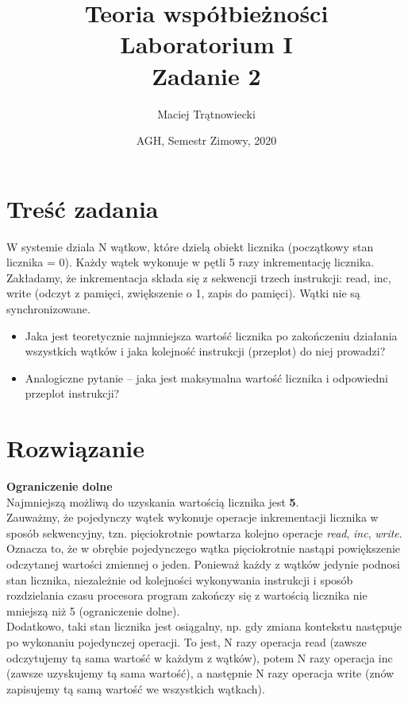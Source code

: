 \documentclass{article}
\title{Teoria współbieżności\\ 
Laboratorium I\\
Zadanie 2}
\author{Maciej Trątnowiecki}
\date{AGH, Semestr Zimowy, 2020}
\begin{document}
    \maketitle
    \section{Treść zadania}
        W systemie dziala N wątkow, które dzielą obiekt licznika (początkowy stan licznika = 0). Każdy wątek wykonuje w pętli 5 razy inkrementację licznika. Zakładamy, że inkrementacja składa się z sekwencji trzech instrukcji: read, inc, write (odczyt z pamięci, zwiększenie o 1, zapis do pamięci). Wątki nie są synchronizowane.
        \begin{itemize}
            \item Jaka jest teoretycznie najmniejsza wartość licznika po zakończeniu działania wszystkich wątków i jaka kolejność instrukcji (przeplot) do niej prowadzi?
            \item Analogiczne pytanie -- jaka jest maksymalna wartość licznika i odpowiedni przeplot instrukcji?
        \end{itemize}
        
    \section{Rozwiązanie}
        \textbf{Ograniczenie dolne}\\
        Najmniejszą możliwą do uzyskania wartością licznika jest \textbf{5}.\\
        Zauważmy, że pojedynczy wątek wykonuje operacje inkrementacji licznika w sposób sekwencyjny, tzn. pięciokrotnie powtarza kolejno operacje \textit{read}, \textit{inc}, \textit{write}. 
        Oznacza to, że w obrębie pojedynczego wątka pięciokrotnie nastąpi powiększenie odczytanej wartości zmiennej o jeden. Ponieważ każdy z wątków jedynie podnosi stan licznika, niezależnie od kolejności wykonywania instrukcji i sposób rozdzielania czasu procesora program zakończy się z wartością licznika nie mniejszą niż 5 (ograniczenie dolne).\\
        Dodatkowo, taki stan licznika jest osiągalny, np. gdy zmiana kontekstu następuje po wykonaniu pojedynczej operacji. To jest, N razy operacja read (zawsze odczytujemy tą sama wartość w każdym z wątków), potem N razy operacja inc (zawsze uzyskujemy tą sama wartość), a następnie N razy operacja write (znów zapisujemy tą samą wartość we wszystkich wątkach).\\
        
\end{document}
